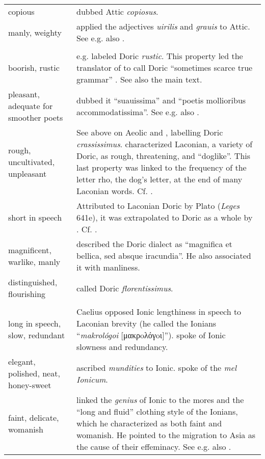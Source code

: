 \begin{longtable}{>{\raggedright\arraybackslash}p{3cm}>{\raggedright\arraybackslash}p{\textwidth - 3\tabcolsep - 3cm}}
 copious & \citet[a.3\textsc{\textsuperscript{v}}]{Canini1555} dubbed Attic \textit{copiosus}.\\
 manly, weighty & \citet[6]{Georgi1729} applied the adjectives \textit{uirilis} and \textit{grauis} to Attic. See e.g. also \citet[515]{Fabricius1711}.\\
\midrule\multicolumn{2}{c}{Doric}\\\midrule
 boorish, rustic & \citet[317]{Bentley1699} e.g. labeled Doric \textit{rustic}. This property led the translator of \citet[117]{Rapin1659} to call Doric “sometimes scarce true grammar” \citep[31]{Rapin1684}. See also the main text.\\
 pleasant, adequate for smoother poets & \citet[a.4\textsc{\textsuperscript{r}}]{Canini1555} dubbed it “suauissima” and “poetis mollioribus accommodatissima”. See e.g. also \citet[139\textsc{\textsuperscript{r}}]{Vuidius1569}.\\
 rough, uncultivated, unpleasant & See above on Aeolic and \citet[46\textsc{\textsuperscript{r}}]{Gessner1555}, labelling Doric \textit{crassissimus}. \citet[54]{Vossius1673} characterized Laconian, a variety of Doric, as rough, threatening, and “doglike”. This last property was linked to the frequency of the letter rho, the dog’s letter, at the end of many Laconian words. Cf. \citet[24]{Munthe1748}.\\
 short in speech & Attributed to Laconian Doric by Plato (\textit{Leges} 641e), it was extrapolated to Doric as a whole by \citet[393]{Saumaise1643a}. Cf. \citet[138\textsc{\textsuperscript{v}}]{Beroaldo1493}.\\
 magnificent, warlike, manly & \citet[55]{Vossius1673} described the Doric dialect as “magnifica et bellica, sed absque iracundia”. He also associated it with manliness.\\
 distinguished, flourishing & \citet[161]{Gesner1774} called Doric \textit{florentissimus}.\\
\midrule\multicolumn{2}{c}{Ionic}\\\midrule
 long in speech, slow, redundant & Caelius \citet[677]{Caelius1542} opposed Ionic lengthiness in speech to Laconian brevity (he called the Ionians “\textit{makrológoi} [μακρoλόγoι]”). \citet[75]{Saumaise1643a} spoke of Ionic slowness and redundancy.\\
 elegant, polished, neat, honey-sweet & \citet[\textsc{a.2}\textsc{\textsuperscript{r}}]{Hauptmann1776} ascribed \textit{mundities} to Ionic. \citet[290]{Verwey1684} spoke of the \textit{mel Ionicum}.\\
 faint, delicate, womanish & \citet[75]{Saumaise1643a} linked the \textit{genius} of Ionic to the mores and the “long and fluid” clothing style of the Ionians, which he characterized as both faint and womanish. He pointed to the migration to Asia as the cause of their effeminacy. See e.g. also \citet[139\textsc{\textsuperscript{r}}]{Vuidius1569}.\\
\end{longtable}
